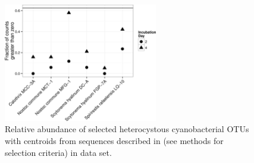\begin{figure}[h!]
  \centering
    \includegraphics[width=0.6\textwidth]{figures/het_sparsity/het_sparsity.png}
  \caption{Relative abundance of selected heterocystous cyanobacterial OTUs with centroids from sequences described in \citet{Yeager} (see methods for selection criteria) in \citet{Steven_2013} data set.}
  \label{fig:het_sparsity}
\end{figure}

